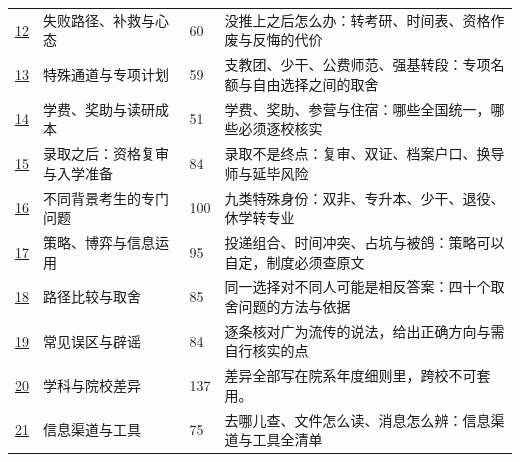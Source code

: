 {\begin{longtable}{p{1.1cm}p{5.4cm}p{1.4cm}p{7.2cm}}
\hyperref[ch12]{12} & 失败路径、补救与心态 & 60 & 没推上之后怎么办：转考研、时间表、资格作废与反悔的代价 \\
\hyperref[ch13]{13} & 特殊通道与专项计划 & 59 & 支教团、少干、公费师范、强基转段：专项名额与自由选择之间的取舍 \\
\hyperref[ch14]{14} & 学费、奖助与读研成本 & 51 & 学费、奖助、参营与住宿：哪些全国统一，哪些必须逐校核实 \\
\hyperref[ch15]{15} & 录取之后：资格复审与入学准备 & 84 & 录取不是终点：复审、双证、档案户口、换导师与延毕风险 \\
\hyperref[ch16]{16} & 不同背景考生的专门问题 & 100 & 九类特殊身份：双非、专升本、少干、退役、休学转专业 \\
\hyperref[ch17]{17} & 策略、博弈与信息运用 & 95 & 投递组合、时间冲突、占坑与被鸽：策略可以自定，制度必须查原文 \\
\hyperref[ch18]{18} & 路径比较与取舍 & 85 & 同一选择对不同人可能是相反答案：四十个取舍问题的方法与依据 \\
\hyperref[ch19]{19} & 常见误区与辟谣 & 84 & 逐条核对广为流传的说法，给出正确方向与需自行核实的点 \\
\hyperref[ch20]{20} & 学科与院校差异 & 137 & 差异全部写在院系年度细则里，跨校不可套用。 \\
\hyperref[ch21]{21} & 信息渠道与工具 & 75 & 去哪儿查、文件怎么读、消息怎么辨：信息渠道与工具全清单 \\
\bottomrule
\end{longtable}
}
